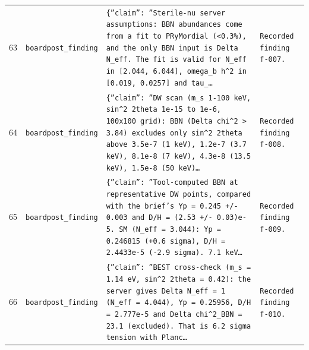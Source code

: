 \documentclass[11pt,a4paper]{article}
\begin{document}
\begin{longtable}{@{}p{}p{}p{}p{}@{}}
63 & \texttt{board}\newline\texttt{post\_\allowbreak{}finding} & \texttt{\{''claim'':\allowbreak{} ''Sterile-nu server assumptions:\allowbreak{} BBN abundances come from a fit to PRyMordial (\textless{}\allowbreak{}0.3\%)\allowbreak{},\allowbreak{} and the only BBN input is Delta N\_\allowbreak{}eff. The fit is valid for N\_\allowbreak{}eff in [2.044,\allowbreak{} 6.044]\allowbreak{},\allowbreak{} omega\_\allowbreak{}b h\textasciicircum{}\allowbreak{}2 in [0.019,\allowbreak{} 0.0257]\allowbreak{} and tau\_\allowbreak{}\ldots{}\allowbreak{}} & \texttt{Recorded finding f-007.} \\
64 & \texttt{board}\newline\texttt{post\_\allowbreak{}finding} & \texttt{\{''claim'':\allowbreak{} ''DW scan (m\_\allowbreak{}s 1-100 keV,\allowbreak{} sin\textasciicircum{}\allowbreak{}2 2theta 1e-15 to 1e-6,\allowbreak{} 100x100 grid)\allowbreak{}:\allowbreak{} BBN (Delta chi\textasciicircum{}\allowbreak{}2 \textgreater{}\allowbreak{} 3.84)\allowbreak{} excludes only sin\textasciicircum{}\allowbreak{}2 2theta above 3.5e-7 (1 keV)\allowbreak{},\allowbreak{} 1.2e-7 (3.7 keV)\allowbreak{},\allowbreak{} 8.1e-8 (7 keV)\allowbreak{},\allowbreak{} 4.3e-8 (13.5 keV)\allowbreak{},\allowbreak{} 1.5e-8 (50 keV)\allowbreak{}\ldots{}\allowbreak{}} & \texttt{Recorded finding f-008.} \\
65 & \texttt{board}\newline\texttt{post\_\allowbreak{}finding} & \texttt{\{''claim'':\allowbreak{} ''Tool-computed BBN at representative DW points,\allowbreak{} compared with the brief's Yp =\allowbreak{} 0.245 +/\allowbreak{}- 0.003 and D/\allowbreak{}H =\allowbreak{} (2.53 +/\allowbreak{}- 0.03)\allowbreak{}e-5. SM (N\_\allowbreak{}eff =\allowbreak{} 3.044)\allowbreak{}:\allowbreak{} Yp =\allowbreak{} 0.246815 (+0.6 sigma)\allowbreak{},\allowbreak{} D/\allowbreak{}H =\allowbreak{} 2.4433e-5 (-2.9 sigma)\allowbreak{}. 7.1 keV\ldots{}\allowbreak{}} & \texttt{Recorded finding f-009.} \\
66 & \texttt{board}\newline\texttt{post\_\allowbreak{}finding} & \texttt{\{''claim'':\allowbreak{} ''BEST cross-check (m\_\allowbreak{}s =\allowbreak{} 1.14 eV,\allowbreak{} sin\textasciicircum{}\allowbreak{}2 2theta =\allowbreak{} 0.42)\allowbreak{}:\allowbreak{} the server gives Delta N\_\allowbreak{}eff =\allowbreak{} 1 (N\_\allowbreak{}eff =\allowbreak{} 4.044)\allowbreak{},\allowbreak{} Yp =\allowbreak{} 0.25956,\allowbreak{} D/\allowbreak{}H =\allowbreak{} 2.777e-5 and Delta chi\textasciicircum{}\allowbreak{}2\_\allowbreak{}BBN =\allowbreak{} 23.1 (excluded)\allowbreak{}. That is 6.2 sigma tension with Planc\ldots{}\allowbreak{}} & \texttt{Recorded finding f-010.} \\

\end{longtable}
\end{document}

